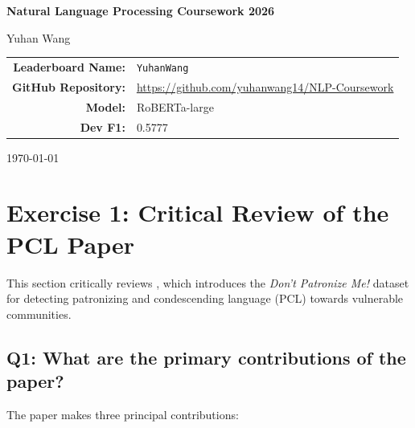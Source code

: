\documentclass[11pt,a4paper]{article}
\begin{document}
\begin{titlepage}
\centering
\vspace*{3cm}

{\LARGE\bfseries Natural Language Processing Coursework 2026}

\vspace{2cm}

{\Large Yuhan Wang}

\vspace{1.5cm}

\begin{tabular}{rl}
    \textbf{Leaderboard Name:} & \texttt{YuhanWang} \\[0.5em]
    \textbf{GitHub Repository:} & \url{https://github.com/yuhanwang14/NLP-Coursework} \\[0.5em]
    \textbf{Model:} & RoBERTa-large \\[0.5em]
    \textbf{Dev F1:} & 0.5777 \\
\end{tabular}

\vfill

{\small \today}
\end{titlepage}

\tableofcontents
\newpage

\section{Exercise 1: Critical Review of the PCL Paper}
\label{sec:ex1}

This section critically reviews \citet{perez2020dont}, which introduces the
\emph{Don't Patronize Me!} dataset for detecting patronizing and condescending
language (PCL) towards vulnerable communities.

\subsection{Q1: What are the primary contributions of the paper?}

The paper makes three principal contributions:
\end{document}
